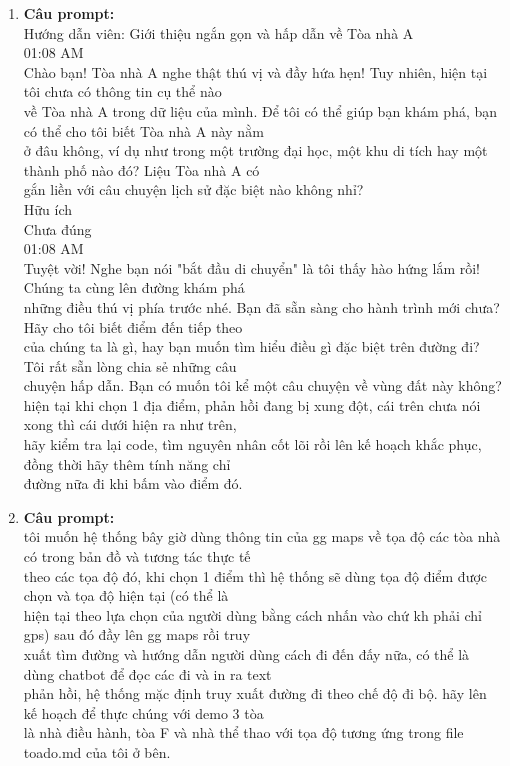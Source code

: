 \begin{enumerate}
\item \textbf{Câu prompt:} \\
\* Hướng dẫn viên: Giới thiệu ngắn gọn và hấp dẫn về Tòa nhà A \\
       01:08 AM \\
       [vi] Chào bạn! Tòa nhà A nghe thật thú vị và đầy hứa hẹn! Tuy nhiên, hiện tại tôi chưa có thông tin cụ thể nào \\
       về Tòa nhà A trong dữ liệu của mình. Để tôi có thể giúp bạn khám phá, bạn có thể cho tôi biết Tòa nhà A này nằm \\
       ở đâu không, ví dụ như trong một trường đại học, một khu di tích hay một thành phố nào đó? Liệu Tòa nhà A có \\
       gắn liền với câu chuyện lịch sử đặc biệt nào không nhỉ? \\
       Hữu ích \\
       Chưa đúng \\
       01:08 AM \\
       [vi] Tuyệt vời! Nghe bạn nói "bắt đầu di chuyển" là tôi thấy hào hứng lắm rồi! Chúng ta cùng lên đường khám phá \\
       những điều thú vị phía trước nhé. Bạn đã sẵn sàng cho hành trình mới chưa? Hãy cho tôi biết điểm đến tiếp theo \\
       của chúng ta là gì, hay bạn muốn tìm hiểu điều gì đặc biệt trên đường đi? Tôi rất sẵn lòng chia sẻ những câu \\
       chuyện hấp dẫn. Bạn có muốn tôi kể một câu chuyện về vùng đất này không? \\
       hiện tại khi chọn 1 địa điểm, phản hồi đang bị xung đột, cái trên chưa nói xong thì cái dưới hiện ra như trên, \\
       hãy kiểm tra lại code, tìm nguyên nhân cốt lõi rồi lên kế hoạch khắc phục, đồng thời hãy thêm tính năng chỉ \\
       đường nữa đi khi bấm vào điểm đó. \\



\item \textbf{Câu prompt:} \\
\* tôi muốn hệ thống bây giờ dùng thông tin của gg maps về tọa độ các tòa nhà có trong bản đồ và tương tác thực tế \\
       theo các tọa độ đó, khi chọn 1 điểm thì hệ thống sẽ dùng tọa độ điểm được chọn và tọa độ hiện tại (có thể là \\
       hiện tại theo lựa chọn của người dùng bằng cách nhấn vào chứ kh phải chỉ gps) sau đó đầy lên gg maps rồi truy \\
       xuất tìm đường và hướng dẫn người dùng cách đi đến đấy nữa, có thể là dùng chatbot để đọc các đi và in ra text \\
       phản hồi, hệ thống mặc định truy xuất đường đi theo chế độ đi bộ. hãy lên kế hoạch để thực chúng với demo 3 tòa \\
       là nhà điều hành, tòa F và nhà thể thao với tọa độ tương ứng trong file toado.md của tôi ở bên. \\




\end{enumerate}
